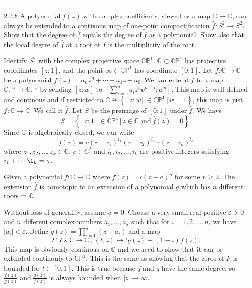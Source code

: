 \documentclass[a4paper, 12pt]{article}
\begin{document}
\noindent\rule{7in}{2.8pt}
\begin{problem}{2.2.8}
A polynomial \(f(z)\) with complex coefficients, viewed as a map \(\mathbb{C}\rightarrow \mathbb{C}\), can always be extended to a continous map of one-point compactification 
\(\hat{f}:S^2\rightarrow S^2\). Show that the degree of \(\hat{f}\) equals the degree of \(f\) as a polynomial. Show also that the local degree of \(\hat{f}\) at a root of \(f\) is the 
multiplicity of the root.
\end{problem}
\begin{solution}
Identify \(S^2\) with the complex projective space \(\mathbb{C}\mathbb{P}^1\). \(\mathbb{C}\subset \mathbb{C}\mathbb{P}^1\) has projective coordinates \([z:1]\), and the point \(\infty\in \mathbb{C}\mathbb{P}^1\) has coordinate 
\([0:1]\). Let \(f:\mathbb{C}\rightarrow \mathbb{C}\) be a polynomial \(f(z)=a_nz^n+\cdots+a_1z+a_0\). We can extend \(f\) to a map \(\mathbb{C} \mathbb{P}^1\rightarrow \mathbb{C} \mathbb{P}^1\) by sending \([z:w]\) to \([\sum_{i=0}^{n}a_iz^iw^{n-i}:w^n]\). This map 
is well-defined and continous and if restricted to \(\mathbb{C}\cong \left\{ [z:w]\in \mathbb{C}\mathbb{P}^1\,|\, w=1 \right\}\), this map is just \(f:\mathbb{C}\rightarrow \mathbb{C}\). We call it \(\hat{f}\).  Let \(S\) be the preimage 
of \([0:1]\) under \(\hat{f}\). We have 
\[S=\left\{ [z:1]\in \mathbb{C} \mathbb{P}^1\,|\, z\in \mathbb{C}\ \text{and}\ \hat{f}(z)=0 \right\}.\]
Since \(\mathbb{C}\) is algebraically closed, we can write 
\[f(z)=c(z-z_1)^{i_1}(z-z_2)^{i_2}\cdots(z-z_k)^{i_k}\]
where \(z_1,z_2,\ldots,z_k\in \mathbb{C}\), \(c\in C^*\) and \(i_1,i_2,\ldots,i_k\) are positive integers satisfying \(i_1+\cdots\i_k=n\). 

\begin{claim}
Given a polynomial \(f:\mathbb{C}\rightarrow \mathbb{C}\) where \(f(z)=c(z-a)^n\) for some \(n\geq 2\). The extension \(\hat{f}\) is homotopic to an extension of a polynomial \(g\) which has \(n\) different roots in \(\mathbb{C}\).
\end{claim}
\begin{claimproof}
Without loss of generality, assume \(a=0\). Choose a very small real positive \(\varepsilon>0\) and \(n\) different complex numbers \(a_1,\ldots,a_n\) such that for \(i=1,2,\ldots,n\), we have \(|a_i|<\varepsilon\). Define \(g(z)=\prod_{i=1}^{n}(z-a_i)\) and a map 
\[F:I\times \mathbb{C}\rightarrow \mathbb{C}\, ,\, (t,z)\mapsto tg(z)+(1-t)f(z).\]
This map is obviously continous on \(\mathbb{C}\) and we need to show that it can be extended continouly to \(\mathbb{C}\mathbb{P}^1\). This is the same as showing that the zeros of \(F\) is bounded for \(t\in [0,1]\). This is true because \(f\) and \(g\) have the same degree, so \(\frac{f(z)}{g(z)}\) and 
\(\frac{g(z)}{f(z)}\) is always bounded when \(|z|\to \infty\).
\end{claimproof}


\end{solution}
\end{document}

